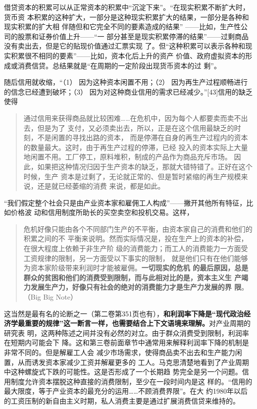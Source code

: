 借贷资本的积累可以从正常资本的积累中“沉淀下来”。“在现实积累不断扩大时，货币资
本积累的这种扩大，一部分是这种现实积累扩大的结果，一部分是各种和现实积累的扩大相
伴随但和它完全不同的要素造成的结果” ——比如，生产性公司的股票和证券价值上升——“一
部分甚至是现实积累停滞的结果”——过剩商品没有卖出去，但是它的贴现价值通过汇票实现
了。但“这种积累可以表示各种和现实积累很不相同的要素”——比如，资本化后上升的资产
价值、政府虚拟资本的形成或消费信贷。总结果就是“在周期的一定阶段出现货币资本的过
剩”。

随后信用就收缩，“（1） 因为这种资本闲置不用；（2） 因为再生产过程顺畅进行的信念已经遭到破坏；（3） 因为对这种商业信用的需求已经减少。”[43]信用的缺乏使得

\begin{quotation}
  通过信用来获得商品就比较困难……在危机中，因为每个人都要卖而卖不出去，但是为了
  支付，又必须卖出去，所以，正是在这个信用最缺乏的时刻，不是闲置的寻找出路的资本，
  而是停滞在自身的再生产过程内的资本的数量最大。这时，由于再生产过程的停滞，已经
  投入的资本实际上大量地闲置不用。工厂停工，原料堆积，制成的产品作为商品充斥市场。
  因此，如果把这种情况归因于生产资本的缺乏，那就大错特错了。正好在这个时候，生产
  资本是过剩了，无论就正常的、但是暂时紧缩的再生产规模来说，还是就已经萎缩的消费
  来说，都是如此。

\end{quotation}

“我们假定整个社会只是由产业资本家和雇佣工人构成”——撇开其他所有特征，比如价格波
动和信用制度所助长的买空卖空和投机交易。这样，

\begin{quotation}
  危机好像只能由各个不同部门生产的不平衡，由资本家自己的消费和他们的积累之间的不
  平衡来说明。然而实际情况是，投在生产上的资本的补偿，在很大程度上依赖于非生产阶
  级的消费能力；而工人的消费能力一方面受工资规律的限制，另一方面受以下事实的限制，
  就是他们只有在他们能够为资本家阶级带来利润时才能被雇佣。\textbf{一切现实的危机
    的最后原因，总是群众的贫困和他们的消费受到限制，而与此相对比的是，资本主义生
    产竭力发展生产力，好像只有社会的绝对的消费能力才是生产力发展的界
    限}。（Big Big Note）


\end{quotation}

这当然是最有名的论断之一（第二卷第351页也有），\textbf{和利润率下降是“现代政治经
  济学最重要的规律”这一断言一样，也需要结合上下文语境来理解。}对产业周期的研究表
明，这两种陈述之间并没有必然的对立。由于群众消费受到限制，利润率在短期内可能会下
降。这和第三卷前面章节中通常用来解释利润率下降的机制是非常不同的。但是解雇工人会
减少市场需求，使得商品卖不出去和生产能力闲置，从而诱发资本家减少工资并解雇更多的
工人。马克思清楚地看到了产业周期中这种螺旋式下跌的可能性。这是否形成了一个长期趋
势完全是另一个问题。信用制度允许资本摆脱这种直接的消费限制，至少在一段时间内是这
样的。“信用的最大限度，等于产业资本的最充分的运用……不顾消费界限”。在大
约1980年以后的工资压制的新自由主义时期，私人消费主要是通过扩展消费信贷来维持的。


